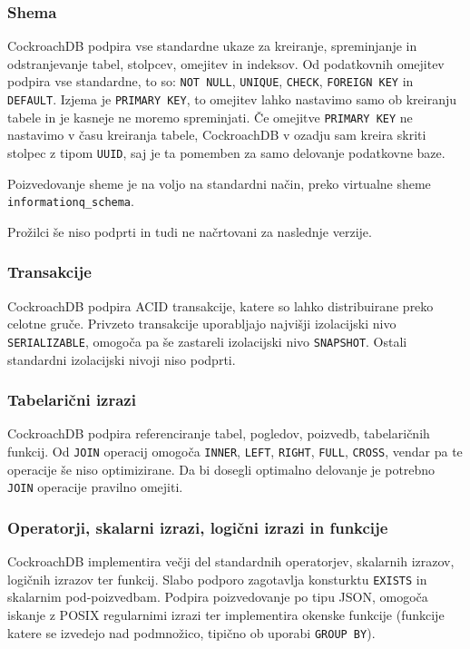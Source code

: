 \documentclass[a4paper, 12pt]{book}
\begin{document}
\subsubsection{Shema}
CockroachDB podpira vse standardne ukaze za kreiranje, spreminjanje in odstranjevanje tabel, stolpcev, omejitev in indeksov. Od podatkovnih omejitev podpira vse standardne, to so: \texttt{NOT NULL}, \texttt{UNIQUE}, \texttt{CHECK}, \texttt{FOREIGN KEY} in \texttt{DEFAULT}. Izjema je \texttt{PRIMARY KEY}, to omejitev lahko nastavimo samo ob kreiranju tabele in je kasneje ne moremo spreminjati. Če omejitve \texttt{PRIMARY KEY} ne nastavimo v času kreiranja tabele, CockroachDB v ozadju sam kreira skriti stolpec z tipom \texttt{UUID}, saj je ta pomemben za samo delovanje podatkovne baze.

Poizvedovanje sheme je na voljo na standardni način, preko virtualne sheme \texttt{informationq\_schema}.

Prožilci še niso podprti in tudi ne načrtovani za naslednje verzije.

\subsubsection{Transakcije}
CockroachDB podpira ACID transakcije, katere so lahko distribuirane preko celotne gruče. Privzeto transakcije uporabljajo najvišji izolacijski nivo \texttt{SE\-RI\-AL\-IZ\-ABLE}, omogoča pa še zastareli izolacijski nivo \texttt{SNAP\-SHOT}. Ostali standardni izolacijski nivoji niso podprti.

\subsubsection{Tabelarični izrazi}
CockroachDB podpira referenciranje tabel, pogledov, poizvedb, tabelaričnih funkcij. Od \texttt{JOIN} operacij omogoča \texttt{INNER}, \texttt{LEFT}, \texttt{RIGHT}, \texttt{FULL}, \texttt{CROSS}, vendar pa te operacije še niso optimizirane. Da bi dosegli optimalno delovanje je potrebno \texttt{JOIN} operacije pravilno omejiti.

\subsubsection{Operatorji, skalarni izrazi, logični izrazi in funkcije}
CockroachDB implementira večji del standardnih operatorjev, skalarnih izrazov, logičnih izrazov ter funkcij. Slabo podporo zagotavlja konsturktu \texttt{EXISTS} in skalarnim pod-poizvedbam. Podpira poizvedovanje po tipu JSON, omogoča iskanje z POSIX regularnimi izrazi ter implementira okenske funkcije (funkcije katere se izvedejo nad podmnožico, tipično ob uporabi \texttt{GROUP BY}).
\end{document}
